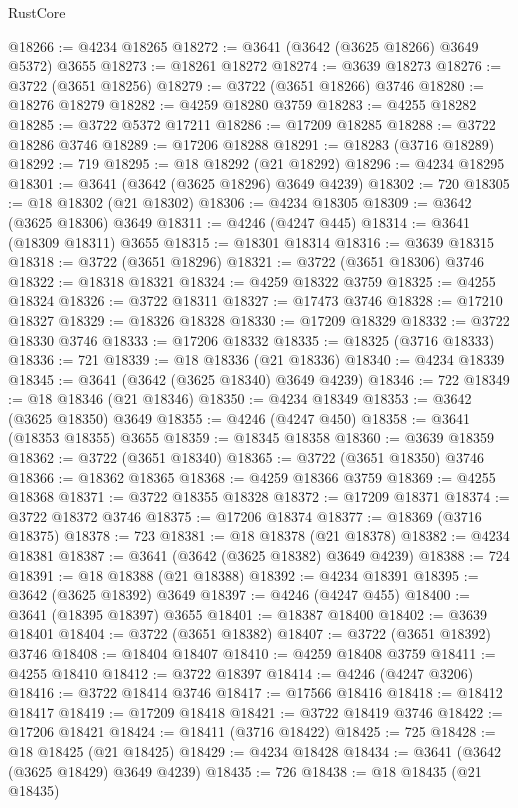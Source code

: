 \begin{lexlean}{RustCore}
\begin{coremodule}
@18266 := @4234 @18265
@18272 := @3641 (@3642 (@3625 @18266) @3649 @5372) @3655
@18273 := @18261 @18272
@18274 := @3639 @18273
@18276 := @3722 (@3651 @18256)
@18279 := @3722 (@3651 @18266) @3746
@18280 := @18276 @18279
@18282 := @4259 @18280 @3759
@18283 := @4255 @18282
@18285 := @3722 @5372 @17211
@18286 := @17209 @18285
@18288 := @3722 @18286 @3746
@18289 := @17206 @18288
@18291 := @18283 (@3716 @18289)
@18292 := 719
@18295 := @18 @18292 (@21 @18292)
@18296 := @4234 @18295
@18301 := @3641 (@3642 (@3625 @18296) @3649 @4239)
@18302 := 720
@18305 := @18 @18302 (@21 @18302)
@18306 := @4234 @18305
@18309 := @3642 (@3625 @18306) @3649
@18311 := @4246 (@4247 @445)
@18314 := @3641 (@18309 @18311) @3655
@18315 := @18301 @18314
@18316 := @3639 @18315
@18318 := @3722 (@3651 @18296)
@18321 := @3722 (@3651 @18306) @3746
@18322 := @18318 @18321
@18324 := @4259 @18322 @3759
@18325 := @4255 @18324
@18326 := @3722 @18311
@18327 := @17473 @3746
@18328 := @17210 @18327
@18329 := @18326 @18328
@18330 := @17209 @18329
@18332 := @3722 @18330 @3746
@18333 := @17206 @18332
@18335 := @18325 (@3716 @18333)
@18336 := 721
@18339 := @18 @18336 (@21 @18336)
@18340 := @4234 @18339
@18345 := @3641 (@3642 (@3625 @18340) @3649 @4239)
@18346 := 722
@18349 := @18 @18346 (@21 @18346)
@18350 := @4234 @18349
@18353 := @3642 (@3625 @18350) @3649
@18355 := @4246 (@4247 @450)
@18358 := @3641 (@18353 @18355) @3655
@18359 := @18345 @18358
@18360 := @3639 @18359
@18362 := @3722 (@3651 @18340)
@18365 := @3722 (@3651 @18350) @3746
@18366 := @18362 @18365
@18368 := @4259 @18366 @3759
@18369 := @4255 @18368
@18371 := @3722 @18355 @18328
@18372 := @17209 @18371
@18374 := @3722 @18372 @3746
@18375 := @17206 @18374
@18377 := @18369 (@3716 @18375)
@18378 := 723
@18381 := @18 @18378 (@21 @18378)
@18382 := @4234 @18381
@18387 := @3641 (@3642 (@3625 @18382) @3649 @4239)
@18388 := 724
@18391 := @18 @18388 (@21 @18388)
@18392 := @4234 @18391
@18395 := @3642 (@3625 @18392) @3649
@18397 := @4246 (@4247 @455)
@18400 := @3641 (@18395 @18397) @3655
@18401 := @18387 @18400
@18402 := @3639 @18401
@18404 := @3722 (@3651 @18382)
@18407 := @3722 (@3651 @18392) @3746
@18408 := @18404 @18407
@18410 := @4259 @18408 @3759
@18411 := @4255 @18410
@18412 := @3722 @18397
@18414 := @4246 (@4247 @3206)
@18416 := @3722 @18414 @3746
@18417 := @17566 @18416
@18418 := @18412 @18417
@18419 := @17209 @18418
@18421 := @3722 @18419 @3746
@18422 := @17206 @18421
@18424 := @18411 (@3716 @18422)
@18425 := 725
@18428 := @18 @18425 (@21 @18425)
@18429 := @4234 @18428
@18434 := @3641 (@3642 (@3625 @18429) @3649 @4239)
@18435 := 726
@18438 := @18 @18435 (@21 @18435)

\end{coremodule}
\end{lexlean}
